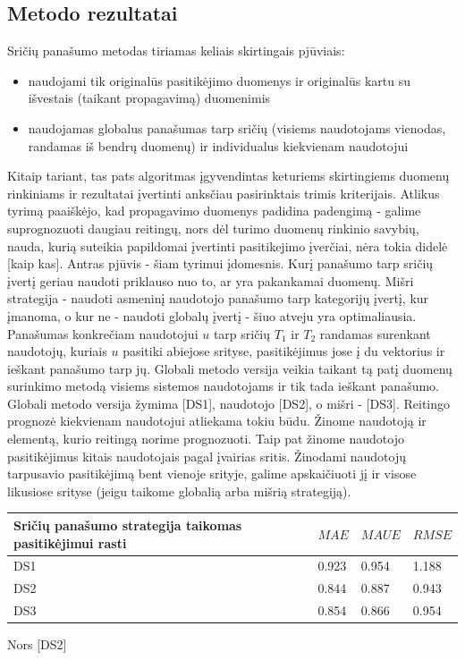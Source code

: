 \documentclass{VUMIFInfMagistrinis}
\begin{document}
\subsection{Metodo rezultatai}
\indent
Sričių panašumo metodas tiriamas keliais skirtingais pjūviais:
\begin{itemize}
	\item naudojami tik originalūs pasitikėjimo duomenys ir originalūs kartu su išvestais (taikant propagavimą) duomenimis
	\item naudojamas globalus panašumas tarp sričių (visiems naudotojams vienodas, randamas iš bendrų duomenų) ir individualus kiekvienam naudotojui
\end{itemize}
\indent
Kitaip tariant, tas pats algoritmas įgyvendintas keturiems skirtingiems duomenų rinkiniams ir rezultatai įvertinti anksčiau pasirinktais trimis kriterijais. Atlikus tyrimą paaiškėjo, kad propagavimo duomenys padidina padengimą - galime suprognozuoti daugiau reitingų, nors dėl turimo duomenų rinkinio savybių, nauda, kurią suteikia papildomai įvertinti pasitikejimo įverčiai, nėra tokia didelė [kaip kas]. 
\newline
\indent 
Antras pjūvis - šiam tyrimui įdomesnis. Kurį panašumo tarp sričių įvertį geriau naudoti priklauso nuo to, ar yra pakankamai duomenų. Mišri strategija - naudoti asmeninį naudotojo panašumo tarp kategorijų įvertį, kur įmanoma, o kur ne - naudoti globalų įvertį - šiuo atveju yra optimaliausia.
\newline
\indent
Panašumas konkrečiam naudotojui $u$ tarp sričių $T_1$ ir $T_2$ randamas surenkant naudotojų, kuriais $u$ pasitiki abiejose srityse, pasitikėjimus jose į du vektorius ir ieškant panašumo tarp jų. Globali metodo versija veikia taikant tą patį duomenų surinkimo metodą visiems sistemos naudotojams ir tik tada ieškant panašumo. Globali metodo versija žymima [DS1], naudotojo [DS2], o mišri - [DS3].
\newline
\indent
Reitingo prognozė kiekvienam naudotojui atliekama tokiu būdu. Žinome naudotoją ir elementą, kurio reitingą norime prognozuoti. Taip pat žinome naudotojo pasitikėjimus kitais naudotojais pagal įvairias sritis. Žinodami naudotojų tarpusavio pasitikėjimą bent vienoje srityje, galime apskaičiuoti jį ir visose likusiose srityse (jeigu taikome globalią arba mišrią strategiją).
\begin{center}
	\begin{tabular}{ | l | l | l | l | }
		\hline
		Sričių panašumo strategija taikomas pasitikėjimui rasti & $MAE$ & $MAUE$ & $RMSE$\\ \hline
		DS1        & 0.923 & 0.954 & 1.188  \\ \hline
		DS2        & 0.844 & 0.887 & 0.943  \\ \hline
		DS3        & 0.854 & 0.866 & 0.954  \\ \hline
		\hline
	\end{tabular}
\end{center}
Nors [DS2]
\end{document}
